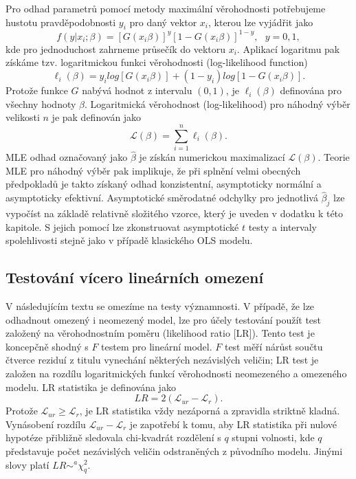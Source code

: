 Pro odhad parametrů pomocí metody maximální věrohodnosti potřebujeme hustotu pravděpodobnosti $y_i$ pro daný vektor $x_i$, kterou lze vyjádřit jako
\begin{equation}
f(y|x_i; \beta) = [G(x_i \beta)]^y[1 - G(x_i\beta)]^{1-y}, ~~~ y = 0, 1,
\end{equation}
kde pro jednoduchost zahrneme průsečík do vektoru $x_i$. Aplikací logaritmu pak získáme tzv. logaritmickou funkci věrohodnosti (log-likelihood function)
\begin{equation}
\ell_i(\beta) = y_i log[G(x_i \beta)] + (1 - y_i)log[1 - G(x_i \beta)].
\end{equation}
Protože funkce $G$ nabývá hodnot z intervalu $(0, 1)$, je $\ell_i(\beta)$ definována pro všechny hodnoty $\beta$. Logaritmická věrohodnost (log-likelihood) pro náhodný výběr velikosti $n$ je pak definován jako
\begin{equation}
\mathscr{L}(\beta) = \sum_{i = 1}^n \ell_i(\beta).
\end{equation}
MLE odhad označovaný jako $\hat{\beta}$ je získán numerickou maximalizací $\mathscr{L}(\beta)$. Teorie MLE pro náhodný výběr pak implikuje, že při splnění velmi obecných předpokladů je takto získaný odhad konzistentní, asymptoticky normální a asymptoticky efektivní. Asymptotické směrodatné odchylky pro jednotlivá $\hat{\beta}_j$ lze vypočíst na základě relativně složitého vzorce, který je uveden v dodatku k této kapitole. S jejich pomocí lze zkonstruovat asymptotické $t$ testy a intervaly spolehlivosti stejně jako v případě klasického OLS modelu.

\subsection{Testování vícero lineárních omezení}

V následujícím textu se omezíme na testy významnosti. V případě, že lze odhadnout omezený i neomezený model, lze pro účely testování použít test založený na věrohodnostním poměru (likelihood ratio [LR]). Tento test je koncepčně shodný s $F$ testem pro lineární model. $F$ test měří nárůst součtu čtverce reziduí z titulu vynechání některých nezávislých veličin; LR test je založen na rozdílu logaritmických funkcí věrohodnosti neomezeného a omezeného modelu. LR statistika je definována jako
\begin{equation}
LR = 2(\mathscr{L}_{ur} - \mathscr{L}_r).
\end{equation}
Protože $\mathscr{L}_{ur} \ge \mathscr{L}_{r}$, je LR statistika vždy nezáporná a zpravidla striktně kladná. Vynásobení rozdílu $\mathscr{L}_{ur} - \mathscr{L}_r$ je zapotřebí k tomu, aby LR statistika při nulové hypotéze přibližně sledovala chi-kvadrát rozdělení s $q$ stupni volnosti, kde $q$ představuje počet nezávislých veličin odstraněných z původního modelu. Jinými slovy platí $LR \sim^a \chi_q^2$.

